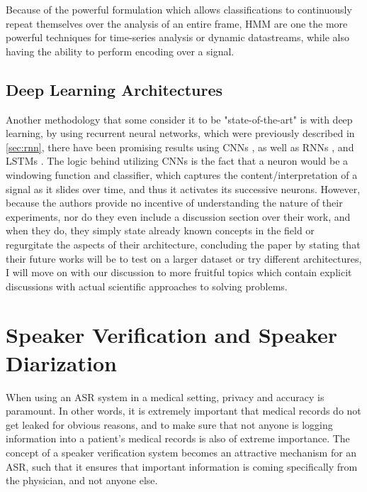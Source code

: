Because of the powerful formulation which allows classifications to continuously repeat themselves over the analysis of an entire frame, HMM are one the more powerful techniques for time-series analysis or dynamic datastreams, while also having the ability to perform encoding over a signal.

\subsection{Deep Learning Architectures}
Another methodology that some consider it to be "state-of-the-art" is with deep learning, by using recurrent neural networks, which were previously described in \ref{sec:rnn}, there have been promising results using CNNs \cite{ASR_CNN_end2end}, as well as RNNs \cite{ASR_RNN} \cite{ASR_RNN_end2end}, and LSTMs \cite{ASR_LSTM}. The logic behind utilizing CNNs is the fact that a neuron would be a windowing function and classifier, which captures the content/interpretation of a signal as it slides over time, and thus it activates its successive neurons. However, because the authors provide no incentive of understanding the nature of their experiments, nor do they even include a discussion section over their work, and when they do, they simply state already known concepts in the field or regurgitate the aspects of their architecture, concluding the paper by stating that their future works will be to test on a larger dataset or try different architectures, I will move on with our discussion to more fruitful topics which contain explicit discussions with actual scientific approaches to solving problems.

\section{Speaker Verification and Speaker Diarization}
When using an ASR system in a medical setting, privacy and accuracy is paramount. In other words, it is extremely important that medical records do not get leaked for obvious reasons, and to make sure that not anyone is logging information into a patient's medical records is also of extreme importance. The concept of a speaker verification system becomes an attractive mechanism for an ASR, such that it ensures that important information is coming specifically from the physician, and not anyone else.

